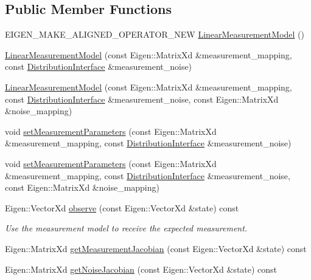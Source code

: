 \subsection*{Public Member Functions}
\begin{DoxyCompactItemize}
\item 
E\+I\+G\+E\+N\+\_\+\+M\+A\+K\+E\+\_\+\+A\+L\+I\+G\+N\+E\+D\+\_\+\+O\+P\+E\+R\+A\+T\+O\+R\+\_\+\+N\+EW \hyperlink{classrefill_1_1LinearMeasurementModel_a90e4ff5a3fd39b3c727b389320ec1e41}{Linear\+Measurement\+Model} ()
\item 
\hyperlink{classrefill_1_1LinearMeasurementModel_ab1b3cb8e8a8e6bc1f311b9cdb96da8b7}{Linear\+Measurement\+Model} (const Eigen\+::\+Matrix\+Xd \&measurement\+\_\+mapping, const \hyperlink{classrefill_1_1DistributionInterface}{Distribution\+Interface} \&measurement\+\_\+noise)
\item 
\hyperlink{classrefill_1_1LinearMeasurementModel_a62be4c770b995a76d9ddf2b8c1e39b4b}{Linear\+Measurement\+Model} (const Eigen\+::\+Matrix\+Xd \&measurement\+\_\+mapping, const \hyperlink{classrefill_1_1DistributionInterface}{Distribution\+Interface} \&measurement\+\_\+noise, const Eigen\+::\+Matrix\+Xd \&noise\+\_\+mapping)
\item 
void \hyperlink{classrefill_1_1LinearMeasurementModel_a4086510d927ce6ad15a94fe7d4fd1a71}{set\+Measurement\+Parameters} (const Eigen\+::\+Matrix\+Xd \&measurement\+\_\+mapping, const \hyperlink{classrefill_1_1DistributionInterface}{Distribution\+Interface} \&measurement\+\_\+noise)
\item 
void \hyperlink{classrefill_1_1LinearMeasurementModel_aa514c963fd37c9aed1b2f60f833fa472}{set\+Measurement\+Parameters} (const Eigen\+::\+Matrix\+Xd \&measurement\+\_\+mapping, const \hyperlink{classrefill_1_1DistributionInterface}{Distribution\+Interface} \&measurement\+\_\+noise, const Eigen\+::\+Matrix\+Xd \&noise\+\_\+mapping)
\item 
Eigen\+::\+Vector\+Xd \hyperlink{classrefill_1_1LinearMeasurementModel_a01404c7ce5395e586738d73213c89e59}{observe} (const Eigen\+::\+Vector\+Xd \&state) const 
\begin{DoxyCompactList}\small\item\em Use the measurement model to receive the expected measurement. \end{DoxyCompactList}\item 
Eigen\+::\+Matrix\+Xd \hyperlink{classrefill_1_1LinearMeasurementModel_a84f3241d0ced9d0b017b498bfed438eb}{get\+Measurement\+Jacobian} (const Eigen\+::\+Vector\+Xd \&state) const 
\item 
Eigen\+::\+Matrix\+Xd \hyperlink{classrefill_1_1LinearMeasurementModel_ab31ce79fd4d2c62717443a052249f8f6}{get\+Noise\+Jacobian} (const Eigen\+::\+Vector\+Xd \&state) const 
\end{DoxyCompactItemize}
